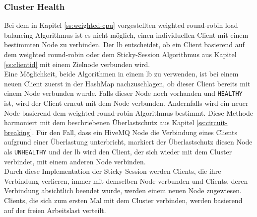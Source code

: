 \newpage
\subsubsection{Cluster Health}
Bei dem in Kapitel \ref{ss:weighted-cpu} vorgestellten weighted round-robin load balancing Algorithmus ist es nicht möglich, einen individuellen Client mit einem bestimmten Node zu verbinden.
Der \acl{lb} entscheidet, ob ein Client basierend auf dem weighted round-robin oder dem Sticky-Session Algorithmus aus Kapitel \ref{ss:clientid} mit einem Zielnode verbunden wird.
\\
Eine Möglichkeit, beide Algorithmen in einem \acl{lb} zu verwenden, ist bei einem neuen Client zuerst in der HashMap nachzuschlagen, ob dieser Client bereits mit einem Node verbunden wurde. Falls dieser Node noch vorhanden und \verb|HEALTHY| ist, wird der Client erneut mit dem Node verbunden. Andernfalls wird ein neuer Node basierend dem weighted round-robin Algorithmus bestimmt.
Diese Methode harmoniert mit dem beschriebenen Überlastschutz aus Kapitel \ref{ss:circuit-breaking}. Für den Fall, dass ein HiveMQ Node die Verbindung eines Clients aufgrund einer Überlastung unterbricht, markiert der Überlastschutz diesen Node als \verb|UNHEALTHY| und der \acl{lb} wird den Client, der sich wieder mit dem Cluster verbindet, mit einem anderen Node verbinden.
\\
Durch diese Implementation der Sticky Session werden Clients, die ihre Verbindung verlieren, immer mit demselben Node verbunden und Clients, deren Verbindung absichtlich beendet wurde, werden einem neuen Node zugewiesen. Clients, die sich zum ersten Mal mit dem Cluster verbinden, werden basierend auf der freien Arbeitslast verteilt.
\newpage
